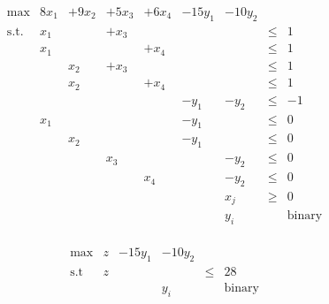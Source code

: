 {\newpage\clearpage
{}%
\begin{displaymath}
       \begin{array}{lrrrrrrcl}
         \max         & 8x_1 & +9x_2 & +5x_3 & +6x_4 & -15y_1 & -10y_2 \\
         \mbox{s.t. } & x_1 &&  +x_3 &&&& \leq & 1 \\
                      & x_1 &&& +x_4  &&& \leq & 1 \\
                      && x_2 &  +x_3 &&&& \leq & 1 \\
                      && x_2 && +x_4  &&& \leq & 1 \\
                      &&&&& -y_1 & -y_2 & \leq & -1 \\
                      &    x_1 &&&&  -y_1 && \leq & 0 \\
                      &&   x_2  &&&  -y_1 && \leq & 0 \\
                      &&&   x_3   &&& -y_2 & \leq & 0 \\
                      &&&&  x_4    && -y_2 & \leq & 0 \\
                      &&&&&& x_j & \geq & 0  \\
                      &&&&&& y_i && \mbox{binary} \\
       \end{array}
     \end{displaymath}%
\lthtmldisplayZ
\hfill\lthtmlcheckvsize\clearpage}

{\newpage\clearpage
{}%
\begin{displaymath}
       \begin{array}{lrrrcl}
         \max         & z & -15y_1 & -10y_2 \\
         \mbox{s.t}   & z &&& \leq & 28 \\
                      &&& y_i && \mbox{binary}
       \end{array}
     \end{displaymath}%
\lthtmldisplayZ
\hfill\lthtmlcheckvsize\clearpage}



